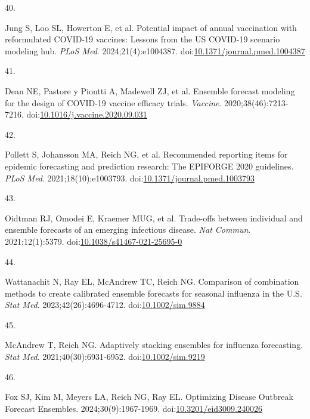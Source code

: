 \documentclass[
]{article}
\newlength{\cslhangindent}
\newlength{\csllabelwidth}
\newenvironment{CSLReferences}[2] %
 {\begin{list}{}{%
  \setlength{\itemindent}{0pt}
  \setlength{\leftmargin}{0pt}
  \setlength{\parsep}{0pt}
  \ifodd #1
   \setlength{\leftmargin}{\cslhangindent}
   \setlength{\itemindent}{-1\cslhangindent}
  \fi
  \setlength{\itemsep}{#2\baselineskip}}}
 {\end{list}}
\newcommand{\CSLLeftMargin}[1]{\parbox[t]{\csllabelwidth}{\strut#1\strut}}
\newcommand{\CSLRightInline}[1]{\parbox[t]{\linewidth - \csllabelwidth}{\strut#1\strut}}
\begin{document}
\begin{CSLReferences}{0}{1}
\CSLLeftMargin{40. }%
\CSLRightInline{Jung S, Loo SL, Howerton E, et al. Potential impact of
annual vaccination with reformulated {COVID}-19 vaccines: {Lessons} from
the {US} {COVID}-19 scenario modeling hub. \emph{PLoS Med}.
2024;21(4):e1004387.
doi:\href{https://doi.org/10.1371/journal.pmed.1004387}{10.1371/journal.pmed.1004387}}

\CSLLeftMargin{41. }%
\CSLRightInline{Dean NE, Pastore y Piontti A, Madewell ZJ, et al.
Ensemble forecast modeling for the design of {COVID}-19 vaccine efficacy
trials. \emph{Vaccine}. 2020;38(46):7213-7216.
doi:\href{https://doi.org/10.1016/j.vaccine.2020.09.031}{10.1016/j.vaccine.2020.09.031}}

\CSLLeftMargin{42. }%
\CSLRightInline{Pollett S, Johansson MA, Reich NG, et al. Recommended
reporting items for epidemic forecasting and prediction research: {The}
{EPIFORGE} 2020 guidelines. \emph{PLoS Med}. 2021;18(10):e1003793.
doi:\href{https://doi.org/10.1371/journal.pmed.1003793}{10.1371/journal.pmed.1003793}}

\CSLLeftMargin{43. }%
\CSLRightInline{Oidtman RJ, Omodei E, Kraemer MUG, et al. Trade-offs
between individual and ensemble forecasts of an emerging infectious
disease. \emph{Nat Commun}. 2021;12(1):5379.
doi:\href{https://doi.org/10.1038/s41467-021-25695-0}{10.1038/s41467-021-25695-0}}

\CSLLeftMargin{44. }%
\CSLRightInline{Wattanachit N, Ray EL, McAndrew TC, Reich NG. Comparison
of combination methods to create calibrated ensemble forecasts for
seasonal influenza in the {U}.{S}. \emph{Stat Med}.
2023;42(26):4696-4712.
doi:\href{https://doi.org/10.1002/sim.9884}{10.1002/sim.9884}}

\CSLLeftMargin{45. }%
\CSLRightInline{McAndrew T, Reich NG. Adaptively stacking ensembles for
influenza forecasting. \emph{Stat Med}. 2021;40(30):6931-6952.
doi:\href{https://doi.org/10.1002/sim.9219}{10.1002/sim.9219}}

\CSLLeftMargin{46. }%
\CSLRightInline{Fox SJ, Kim M, Meyers LA, Reich NG, Ray EL. Optimizing
{Disease} {Outbreak} {Forecast} {Ensembles}. 2024;30(9):1967-1969.
doi:\href{https://doi.org/10.3201/eid3009.240026}{10.3201/eid3009.240026}}


\end{CSLReferences}
\end{document}
